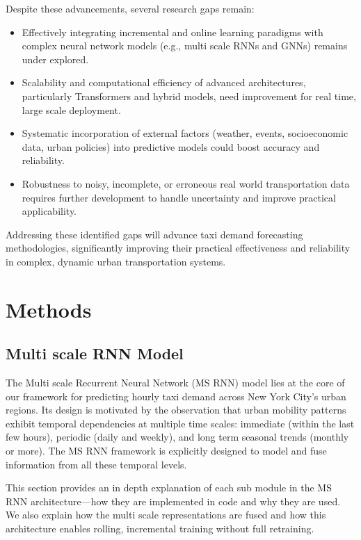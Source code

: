 \documentclass{article}
\begin{document}
Despite these advancements, several research gaps remain:

\begin{itemize}
  \item Effectively integrating incremental and online learning paradigms with complex neural network models (e.g., multi scale RNNs and GNNs) remains under explored.
  \item Scalability and computational efficiency of advanced architectures, particularly Transformers and hybrid models, need improvement for real time, large scale deployment.
  \item Systematic incorporation of external factors (weather, events, socioeconomic data, urban policies) into predictive models could boost accuracy and reliability.
  \item Robustness to noisy, incomplete, or erroneous real world transportation data requires further development to handle uncertainty and improve practical applicability.
\end{itemize}

Addressing these identified gaps will advance taxi demand forecasting methodologies, significantly improving their practical effectiveness and reliability in complex, dynamic urban transportation systems.


\section{Methods}

\subsection{Multi scale RNN Model}

The Multi scale Recurrent Neural Network (MS RNN) model lies at the core of our framework for predicting hourly taxi demand across New York City's urban regions. Its design is motivated by the observation that urban mobility patterns exhibit temporal dependencies at multiple time scales: immediate (within the last few hours), periodic (daily and weekly), and long term seasonal trends (monthly or more). The MS RNN framework is explicitly designed to model and fuse information from all these temporal levels.

This section provides an in depth explanation of each sub module in the MS RNN architecture—how they are implemented in code and why they are used. We also explain how the multi scale representations are fused and how this architecture enables rolling, incremental training without full retraining.
\end{document}
